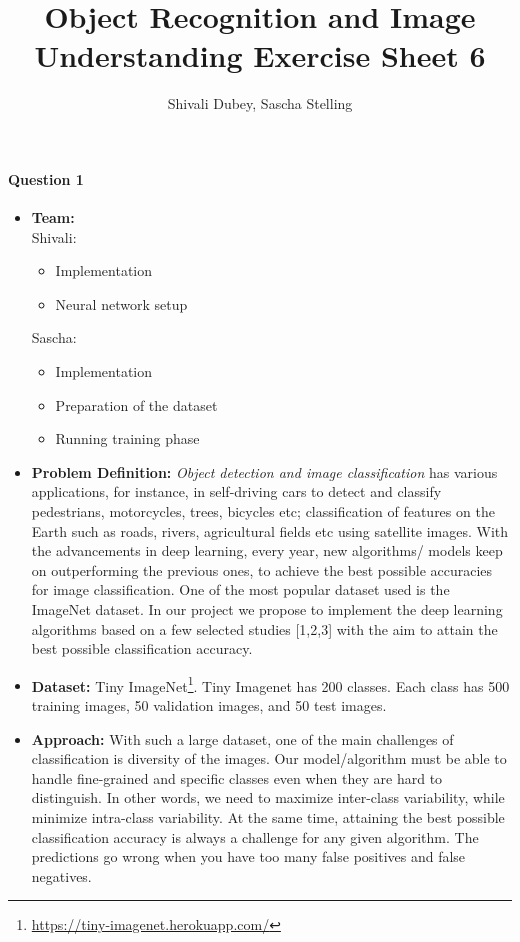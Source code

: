 \documentclass[10pt,a4]{article}
\author{Shivali Dubey, Sascha Stelling}
\title{Object Recognition and Image Understanding Exercise Sheet 6}
\begin{document}
\maketitle

\paragraph{Question 1}
\begin{itemize}
	\item \textbf{Team:} \\Shivali:
	\begin{itemize}
		\item Implementation
		\item Neural network setup
	\end{itemize}
	Sascha:
	\begin{itemize}
		\item Implementation
		\item Preparation of the dataset
		\item Running training phase
	\end{itemize}
	\item \textbf{Problem Definition:} \textit{Object detection and image classification} has various applications, for instance, in self-driving cars to detect and classify pedestrians, motorcycles, trees, bicycles etc; classification of features on the Earth such as roads, rivers, agricultural fields etc using satellite images. With the advancements in deep learning, every year, new algorithms/ models keep on outperforming the previous ones, to achieve the best possible accuracies for image classification. One of the most popular dataset used is the ImageNet dataset. In our project we propose to implement the deep learning algorithms based on a few selected studies [1,2,3] with the aim to attain the best possible classification accuracy.
	
	\item \textbf{Dataset:} Tiny ImageNet\footnote{\url{https://tiny-imagenet.herokuapp.com/}}. Tiny Imagenet has 200 classes. Each class has 500 training images, 50 validation images, and 50 test images.
	
	\item \textbf{Approach:} With such a large dataset, one of the main challenges of classification is diversity of the images. Our model/algorithm must be able to handle fine-grained and specific classes even when they are hard to distinguish. In other words, we need to maximize inter-class variability, while minimize intra-class variability. At the same time, attaining the best possible classification accuracy is always a challenge for any given algorithm. The predictions go wrong when you have too many false positives and false negatives.
	

\end{itemize}
\end{document}
